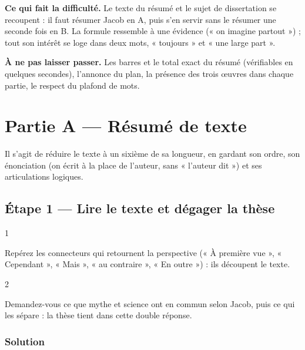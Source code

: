 \documentclass[11pt,a4paper]{article}
\begin{document}
\textbf{Ce qui fait la difficulté.} Le texte du résumé et le sujet de dissertation se recoupent : il faut résumer Jacob en A, puis s'en servir sans le résumer une seconde fois en B. La formule ressemble à une évidence (« on imagine partout ») ; tout son intérêt se loge dans deux mots, « toujours » et « une large part ».

\textbf{À ne pas laisser passer.} Les barres et le total exact du résumé (vérifiables en quelques secondes), l'annonce du plan, la présence des trois œuvres dans chaque partie, le respect du plafond de mots.

\hypertarget{partie-a-ruxe9sumuxe9-de-texte}{%
\section{Partie A --- Résumé de texte}\label{partie-a-ruxe9sumuxe9-de-texte}}

Il s'agit de réduire le texte à un sixième de sa longueur, en gardant son ordre, son énonciation (on écrit à la place de l'auteur, sans « l'auteur dit ») et ses articulations logiques.

\hypertarget{uxe9tape-1-lire-le-texte-et-duxe9gager-la-thuxe8se}{%
\subsection{Étape 1 --- Lire le texte et dégager la thèse}\label{uxe9tape-1-lire-le-texte-et-duxe9gager-la-thuxe8se}}

\begin{indication}{1}

Repérez les connecteurs qui retournent la perspective (« À première vue », « Cependant », « Mais », « au contraire », « En outre ») : ils découpent le texte.

\end{indication}

\begin{indication}{2}

Demandez-vous ce que mythe et science ont en commun selon Jacob, puis ce qui les sépare : la thèse tient dans cette double réponse.

\end{indication}

\hypertarget{solution}{%
\subsubsection{Solution}\label{solution}}
\end{document}
